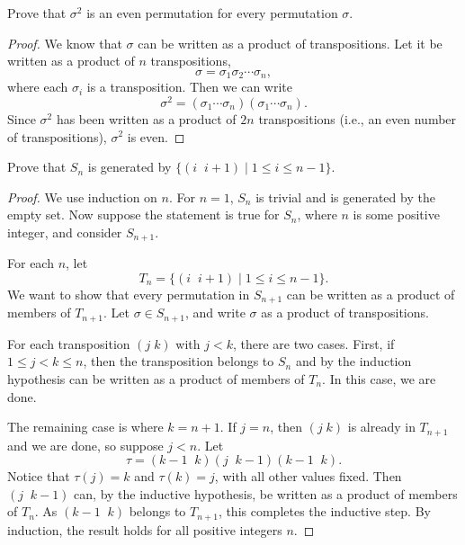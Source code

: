  Prove that $\sigma^2$ is an even permutation for every
permutation $\sigma$.
\begin{proof}
  We know that $\sigma$ can be written as a product of
  transpositions. Let it be written as a product of $n$
  transpositions,
  \begin{equation*}
    \sigma = \sigma_1\sigma_2\cdots\sigma_n,
  \end{equation*}
  where each $\sigma_i$ is a transposition. Then we can write
  \begin{equation*}
    \sigma^2 = (\sigma_1\cdots\sigma_n)(\sigma_1\cdots\sigma_n).
  \end{equation*}
  Since $\sigma^2$ has been written as a product of $2n$
  transpositions (i.e., an even number of transpositions), $\sigma^2$
  is even.
\end{proof}

 Prove that $S_n$ is generated by
$\{(i\;\;i+1) \mid 1\leq i\leq n - 1\}$.
\begin{proof}
  We use induction on $n$. For $n = 1$, $S_n$ is trivial and is
  generated by the empty set. Now suppose the statement is true for
  $S_n$, where $n$ is some positive integer, and consider $S_{n+1}$.

  For each $n$, let
  \begin{equation*}
    T_n = \{(i\;\;i+1) \mid 1\leq i\leq n-1\}.
  \end{equation*}
  We want to show that every permutation in $S_{n+1}$ can be written
  as a product of members of $T_{n+1}$. Let $\sigma\in S_{n+1}$, and
  write $\sigma$ as a product of transpositions.

  For each transposition $(j\;k)$ with $j < k$, there are two
  cases. First, if $1\leq j < k \leq n$, then the transposition
  belongs to $S_n$ and by the induction hypothesis can be written as a
  product of members of $T_n$. In this case, we are done.

  The remaining case is where $k = n+1$. If $j = n$, then $(j\;k)$ is
  already in $T_{n+1}$ and we are done, so suppose $j < n$. Let
  \begin{equation*}
    \tau = (k - 1\;\;k)(j\;\;k-1)(k-1\;\;k).
  \end{equation*}
  Notice that $\tau(j) = k$ and $\tau(k) = j$, with all other values
  fixed. Then $(j\;\;k-1)$ can, by the inductive hypothesis, be
  written as a product of members of $T_n$. As $(k-1\;\;k)$ belongs to
  $T_{n+1}$, this completes the inductive step. By induction, the
  result holds for all positive integers $n$.
\end{proof}
